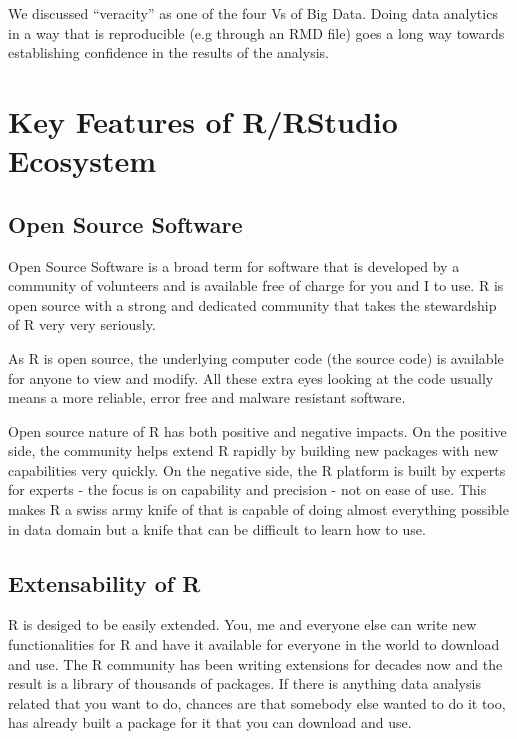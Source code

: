 \documentclass[
]{krantz}
\begin{document}
We discussed ``veracity'' as one of the four Vs of Big Data. Doing data analytics in a way that is reproducible (e.g through an RMD file) goes a long way towards establishing confidence in the results of the analysis.

\hypertarget{key-features-of-rrstudio-ecosystem}{%
\section{Key Features of R/RStudio Ecosystem}\label{key-features-of-rrstudio-ecosystem}}

\hypertarget{open-source-software}{%
\subsection{Open Source Software}\label{open-source-software}}

Open Source Software is a broad term for software that is developed by a community of volunteers and is available free of charge for you and I to use. R is open source with a strong and dedicated community that takes the stewardship of R very very seriously.

As R is open source, the underlying computer code (the source code) is available for anyone to view and modify. All these extra eyes looking at the code usually means a more reliable, error free and malware resistant software.

Open source nature of R has both positive and negative impacts. On the positive side, the community helps extend R rapidly by building new packages with new capabilities very quickly. On the negative side, the R platform is built by experts for experts - the focus is on capability and precision - not on ease of use. This makes R a swiss army knife of that is capable of doing almost everything possible in data domain but a knife that can be difficult to learn how to use.

\hypertarget{extensability-of-r}{%
\subsection{Extensability of R}\label{extensability-of-r}}

R is desiged to be easily extended. You, me and everyone else can write new functionalities for R and have it available for everyone in the world to download and use. The R community has been writing extensions for decades now and the result is a library of thousands of packages. If there is anything data analysis related that you want to do, chances are that somebody else wanted to do it too, has already built a package for it that you can download and use.
\end{document}
